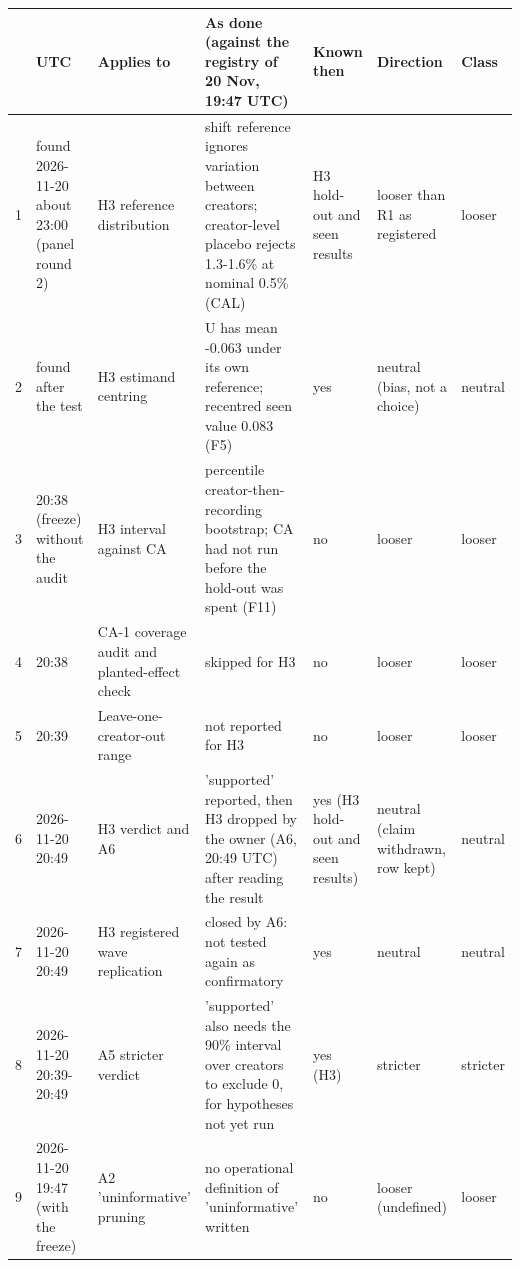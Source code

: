 {\tiny\setlength{\tabcolsep}{2pt}
\begin{tabular}{@{}rp{}p{}p{}p{}p{}l@{}}
\toprule
 & UTC & Applies to & As done (against the registry of 20 Nov, 19:47 UTC) & Known then & Direction & Class \\
\midrule
1 & found 2026-11-20 about 23:00 (panel round 2) & H3 reference distribution & shift reference ignores variation between creators; creator-level placebo rejects 1.3-1.6\% at nominal 0.5\% (CAL) & H3 hold-out and seen results & looser than R1 as registered & looser \\
2 & found after the test & H3 estimand centring & U has mean -0.063 under its own reference; recentred seen value 0.083 (F5) & yes & neutral (bias, not a choice) & neutral \\
3 & 20:38 (freeze) without the audit & H3 interval against CA & percentile creator-then-recording bootstrap; CA had not run before the hold-out was spent (F11) & no & looser & looser \\
4 & 20:38 & CA-1 coverage audit and planted-effect check & skipped for H3 & no & looser & looser \\
5 & 20:39 & Leave-one-creator-out range & not reported for H3 & no & looser & looser \\
6 & 2026-11-20 20:49 & H3 verdict and A6 & 'supported' reported, then H3 dropped by the owner (A6, 20:49 UTC) after reading the result & yes (H3 hold-out and seen results) & neutral (claim withdrawn, row kept) & neutral \\
7 & 2026-11-20 20:49 & H3 registered wave replication & closed by A6: not tested again as confirmatory & yes & neutral & neutral \\
8 & 2026-11-20 20:39-20:49 & A5 stricter verdict & 'supported' also needs the 90\% interval over creators to exclude 0, for hypotheses not yet run & yes (H3) & stricter & stricter \\
9 & 2026-11-20 19:47 (with the freeze) & A2 'uninformative' pruning & no operational definition of 'uninformative' written & no & looser (undefined) & looser \\

\end{tabular}}
